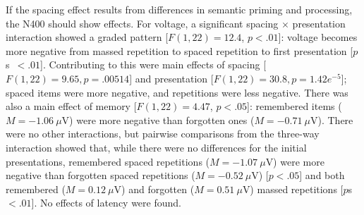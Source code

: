 If the spacing effect results from differences in semantic priming and processing, the N400 should show effects.
For voltage, a significant spacing $\times$ presentation interaction showed a graded pattern [$F(1,22)=12.4$, $p<.01$]: voltage becomes more negative from massed repetition to spaced repetition to first presentation [$p$s~$<.01$].  Contributing to this were main effects of spacing [$F(1,22)=9.65, p=.00514$] and presentation [$F(1,22)=30.8, p=1.42e^{-5}$]; spaced items were more negative, and repetitions were less negative.  There was also a main effect of memory [$F(1,22)=4.47$, $p<.05$]: remembered items ($M=-1.06~\mu$V) were more negative than forgotten ones ($M=-0.71~\mu$V).
There were no other interactions, but pairwise comparisons from the three-way interaction showed that, while there were no differences for the initial presentations, remembered spaced repetitions ($M=-1.07~\mu$V) were more negative than forgotten spaced repetitions ($M=-0.52~\mu$V) [$p<.05$] and both remembered ($M=0.12~\mu$V) and forgotten ($M=0.51~\mu$V) massed repetitions [$p$s~$<.01$].
No effects of latency were found.

